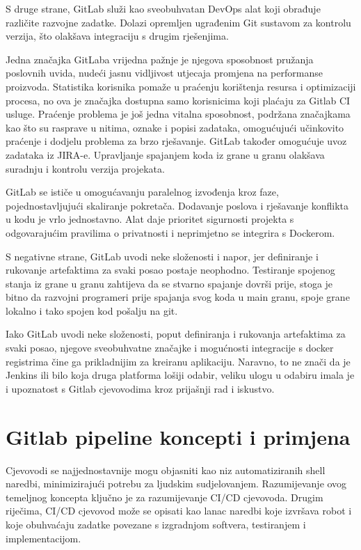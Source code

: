 \documentclass[a4paper,12pt,oneside]{article}
\begin{document}
S druge strane, GitLab služi kao sveobuhvatan DevOps alat koji obrađuje različite razvojne zadatke. Dolazi opremljen ugrađenim Git sustavom za kontrolu verzija, što olakšava integraciju s drugim rješenjima.

Jedna značajka GitLaba vrijedna pažnje je njegova sposobnost pružanja poslovnih uvida, nudeći jasnu vidljivost utjecaja promjena na performanse proizvoda. Statistika korisnika pomaže u praćenju korištenja resursa i optimizaciji procesa, no ova je značajka dostupna samo korisnicima koji plaćaju za Gitlab CI usluge. Praćenje problema je još jedna vitalna sposobnost, podržana značajkama kao što su rasprave u nitima, oznake i popisi zadataka, omogućujući učinkovito praćenje i dodjelu problema za brzo rješavanje. GitLab također omogućuje uvoz zadataka iz JIRA-e. Upravljanje spajanjem koda iz grane u granu olakšava suradnju i kontrolu verzija projekata.

GitLab se ističe u omogućavanju paralelnog izvođenja kroz faze, pojednostavljujući skaliranje pokretača. Dodavanje poslova i rješavanje konflikta u kodu je vrlo jednostavno. Alat daje prioritet sigurnosti projekta s odgovarajućim pravilima o privatnosti i neprimjetno se integrira s Dockerom.

S negativne strane, GitLab uvodi neke složenosti i napor, jer definiranje i rukovanje artefaktima za svaki posao postaje neophodno. Testiranje spojenog stanja iz grane u granu zahtijeva da se stvarno spajanje dovrši prije, stoga je bitno da razvojni programeri prije spajanja svog koda u main granu, spoje grane lokalno i tako spojen kod pošalju na git.

Iako GitLab uvodi neke složenosti, poput definiranja i rukovanja artefaktima za svaki posao, njegove sveobuhvatne značajke i mogućnosti integracije s docker registrima čine ga prikladnijim za kreiranu aplikaciju. Naravno, to ne znači da je Jenkins ili bilo koja druga platforma lošiji odabir, veliku ulogu u odabiru imala je i upoznatost s Gitlab cjevovodima kroz prijašnji rad i iskustvo.


\section{Gitlab pipeline koncepti i primjena}

Cjevovodi se najjednostavnije mogu objasniti kao niz automatiziranih shell naredbi, minimizirajući potrebu za ljudskim sudjelovanjem. Razumijevanje ovog temeljnog koncepta ključno je za razumijevanje CI/CD cjevovoda. Drugim riječima, CI/CD cjevovod može se opisati kao lanac naredbi koje izvršava robot i koje obuhvaćaju zadatke povezane s izgradnjom softvera, testiranjem i implementacijom.
\end{document}
